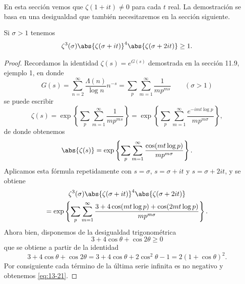     En esta sección vemos que $\zeta(1+it)\neq0$ para cada $t$ real. La demostración se basa
    en una desigualdad que también necesitaremos en la sección siguiente.

    \begin{teorema}\label{teo:13-5}
        Si $\sigma>1$ tenemos
        \begin{equation}\label{eq:13-21}
            \zeta^3(\sigma)\abs{\zeta(\sigma+it)}^4\abs{\zeta(\sigma+2it)}\geq1.
        \end{equation}
    \end{teorema}

    \begin{proof}
        Recordamos la identidad $\zeta(s)=e^{G(s)}$ demostrada en la sección 11.9, ejemplo 1,
        en donde
        \begin{equation*}
            G(s)=\sum_{n=2}^{\infty}\frac{\Lambda(n)}{\log n}n^{-s}=\sum_p\sum_{m=1}^{\infty}\frac{1}{mp^{ms}}\qquad(\sigma>1)
        \end{equation*}
        se puede escribir
        \begin{equation*}
            \zeta(s)=\exp\left\{\sum_p\sum_{m=1}^{\infty}\frac{1}{mp^{ms}}\right\}=\exp\left\{\sum_p\sum_{m=1}^{\infty}\frac{e^{-imt\log p}}{mp^{m\sigma}}\right\},
        \end{equation*}
        de donde obtenemos
        \begin{equation*}
            \abs{\zeta(s)}=\exp\left\{\sum_p\sum_{m=1}^{\infty}\frac{\cos(mt\log p)}{mp^{m\sigma}}\right\}.
        \end{equation*}
        Aplicamos esta fórmula repetidamente con $s=\sigma$, $s=\sigma+it$ y $s=\sigma+2it$, y se
        obtiene
        \begin{multline*}
            \zeta^3(\sigma)\abs{\zeta(\sigma+it)}^4\abs{\zeta(\sigma+2it)}\\
            =\exp\left\{\sum_p\sum_{m=1}^{\infty}\frac{3+4\cos(mt\log p)+\cos(2mt\log p)}{mp^{m\sigma}}\right\}.
        \end{multline*}
        Ahora bien, disponemos de la desigualdad trigonométrica
        \begin{equation*}
            3+4\cos\theta+\cos2\theta\geq0
        \end{equation*}
        que se obtiene a partir de la identidad
        \begin{equation*}
            3+4\cos\theta+\cos2\theta=3+4\cos\theta+2\cos^2\theta-1=2(1+\cos\theta)^2.
        \end{equation*}
        Por consiguiente cada término de la última serie infinita es no negativo y obtenemos
        \eqref{eq:13-21}.
    \end{proof}

